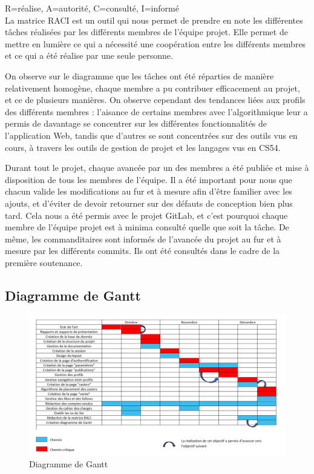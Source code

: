 \documentclass[11pt]{article}
\begin{document}
R=réalise, A=autorité, C=consulté, I=informé \\


La matrice RACI est un outil qui nous permet de prendre en note les différentes tâches réalisées par les différents membres de l'équipe projet. Elle permet de mettre en lumière ce qui a nécessité une coopération entre les différents membres et ce qui a été réalise par une seule personne. 

On observe sur le diagramme que les tâches ont été réparties de manière relativement homogène, chaque membre a pu contribuer efficacement au projet, et ce de plusieurs manières. On observe cependant des tendances liées aux profils des différents membres : l'aisance de certains membres avec l'algorithmique  leur a permis de davantage se concentrer sur les différentes fonctionnalités de l'application Web, tandis que d'autres se sont concentrées sur des outils vus en cours, à travers les outils de gestion de projet et les langages vus en CS54.

Durant tout le projet, chaque avancée par un des membres a été publiée et mise à disposition de tous les membres de l'équipe. Il a été important pour nous que chacun valide les modifications au fur et à mesure afin d'être familier avec les ajouts, et d'éviter de devoir retourner sur des défauts de conception bien plus tard. Cela nous a été permis avec le projet GitLab, et c'est pourquoi chaque membre de l'équipe projet est à minima consulté quelle que soit la tâche. De même, les commanditaires sont informés de l'avancée du projet au fur et à mesure par les différents commits. Ils ont été consultés dans le cadre de la première soutenance.


\newpage %

\subsection{Diagramme de Gantt}

 \begin{figure}[h]
     \centering
     \includegraphics[scale=0.7]{Diagramme_Gantt.PNG}
     \caption{Diagramme de Gantt}
 \end{figure}
 
\end{document}

